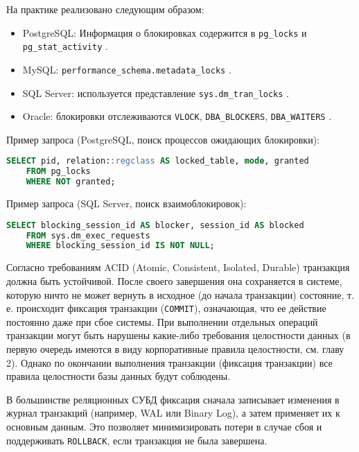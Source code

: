 На практике реализовано следующим образом:
\begin{itemize}
    \item PostgreSQL: Информация о блокировках содержится в \texttt{pg\_locks} и \texttt{pg\_stat\_activity} \autocites[§52.12]{PostgreSQLdocc52}[§27.2.3]{PostgreSQLdocc27}.
    \item MySQL: \texttt{performance\_schema.metadata\_locks} \autocite[§29.12.13]{Mysqldoc2}.
    \item SQL Server: используется представление \texttt{sys.dm\_tran\_locks} \autocite{MicrosoftLearnSQLserverTranLocks}.
    \item Oracle: блокировки отслеживаются \texttt{V\textdollar LOCK}, \texttt{DBA\_BLOCKERS}, \texttt{DBA\_WAITERS} \autocites[c.8 §40]{oracledbdoc2}[c.4 §180, c.6 §103]{oracledbdoc1}.
\end{itemize}

Пример запроса (PostgreSQL, поиск процессов ожидающих блокировки):
\begin{lstlisting}[language=SQL]
    SELECT pid, relation::regclass AS locked_table, mode, granted
    FROM pg_locks
    WHERE NOT granted;              
\end{lstlisting}

Пример запроса (SQL Server, поиск взаимоблокировок):
\begin{lstlisting}[language=SQL]
    SELECT blocking_session_id AS blocker, session_id AS blocked
    FROM sys.dm_exec_requests
    WHERE blocking_session_id IS NOT NULL;             
\end{lstlisting}

Согласно требованиям ACID (Atomic, Consistent, Isolated, Durable) транзакция должна быть устойчивой. После своего завершения она сохраняется в системе, которую ничто не может вернуть в исходное (до начала транзакции) состояние, т. е. происходит фиксация транзакции (\texttt{COMMIT}), означающая, что ее действие постоянно даже при сбое системы. При выполнении отдельных операций транзакции могут быть нарушены какие-либо требования целостности данных (в первую очередь имеются в виду корпоративные правила целостности, см. главу 2). Однако по окончании выполнения транзакции (фиксация транзакции) все правила целостности базы данных будут соблюдены.

В большинстве реляционных СУБД фиксация сначала записывает изменения в журнал транзакций (например, WAL или Binary Log), а затем применяет их к основным данным. Это позволяет минимизировать потери в случае сбоя и поддерживать \texttt{ROLLBACK}, если транзакция не была завершена.

